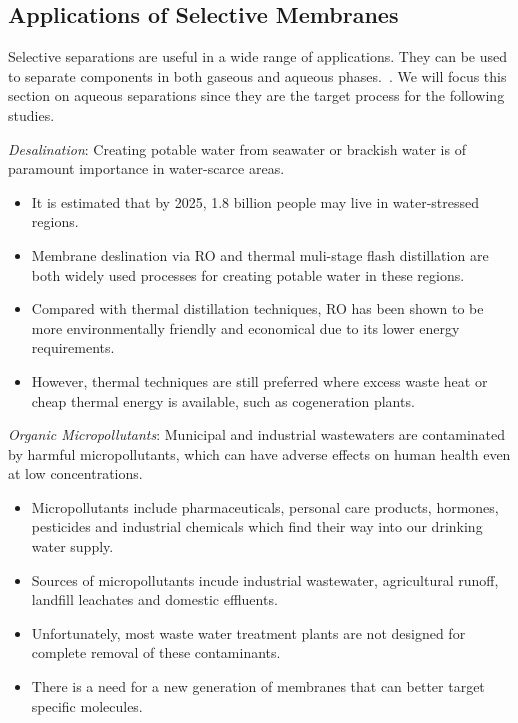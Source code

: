   \subsection{Applications of Selective Membranes}
  
  Selective separations are useful in a wide range of applications. They can be used
  to separate components in both gaseous and aqueous phases.~\cite{baker_gas_2014}. We 
  will focus this section on aqueous separations since they are the target process
  for the following studies.
  
  \textit{Desalination}: Creating potable water from seawater or brackish water is of 
  paramount importance in water-scarce areas. 
  \begin{itemize}
    \item It is estimated that by 2025, 1.8 billion people may live in water-stressed
    regions.~\cite{navarro-ortega_managing_2015} %
    \item Membrane deslination via RO and thermal muli-stage flash distillation are 
    both widely used processes for creating potable water in these regions.~\cite{fritzmann_state---art_2007}
  	\item Compared with thermal distillation techniques, RO has been shown to 
  	be more environmentally friendly and economical due to its lower energy
  	requirements.\cite{morton_environmental_1997}
  	\item However, thermal techniques are still preferred where excess waste heat or cheap 
  	thermal energy is available, such as cogeneration plants.\cite{bhojwani_technology_2019}
  \end{itemize}

  \textit{Organic Micropollutants}: Municipal and industrial wastewaters are contaminated by harmful
  micropollutants, which can have adverse effects on human health even at low 
  concentrations.\cite{schwarzenbach_challenge_2006}
  \begin{itemize}
    \item Micropollutants include pharmaceuticals, personal care products, 
    hormones, pesticides and industrial chemicals which find their way into
    our drinking water supply.~\cite{barbosa_occurrence_2016}
    \item Sources of micropollutants incude industrial wastewater, 
    agricultural runoff, landfill leachates and domestic effluents.~\cite{mompelat_occurrence_2009}
    \item Unfortunately, most waste water treatment plants are not 
    designed for complete removal of these contaminants.~\cite{tijani_review_2013}
    \item There is a need for a new generation of membranes that can better
    target specific molecules.
  \end{itemize}
  

